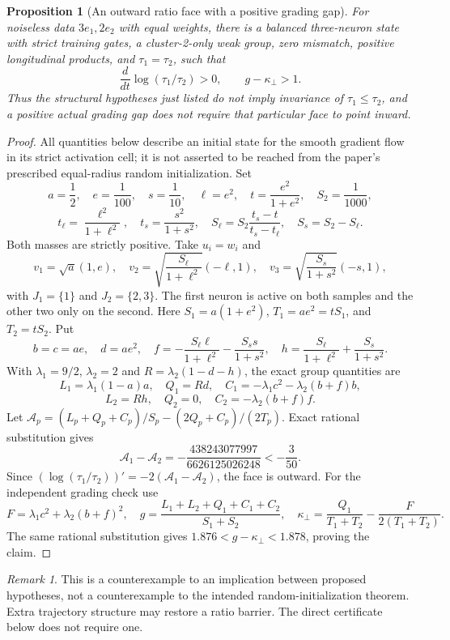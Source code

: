 \documentclass{article} %
\theoremstyle{plain}
\newtheorem{proposition}[theorem]{Proposition}
\theoremstyle{definition}
\theoremstyle{remark}
\newtheorem{remark}[theorem]{Remark}
\begin{document}
\begin{proposition}[An outward ratio face with a positive grading gap]
\label{sbgap:counterexample}
For noiseless data $3e_1,2e_2$ with equal weights, there is a balanced
three-neuron state with strict training gates, a cluster-2-only weak group,
zero mismatch, positive
longitudinal products, and $\tau_1=\tau_2$, such that
\[
 \frac{d}{dt}\log(\tau_1/\tau_2)>0,\qquad
 g-\kappa_\perp>1.
\]
Thus the structural hypotheses just listed do not imply invariance of
$\tau_1\le\tau_2$, and a positive actual grading gap does not require that
particular face to point inward.
\end{proposition}
\begin{proof}
All quantities below describe an initial state for the smooth gradient
flow in its strict activation cell; it is not asserted to be reached
from the paper's prescribed equal-radius random initialization.
Set
\[
 a=\frac12,\quad e=\frac1{100},\quad s=\frac1{10},\quad
 \ell=e^2,\quad t=\frac{e^2}{1+e^2},\quad S_2=\frac1{1000},
\]
\[
 t_\ell=\frac{\ell^2}{1+\ell^2},\quad
 t_s=\frac{s^2}{1+s^2},\quad
 S_\ell=S_2\frac{t_s-t}{t_s-t_\ell},\quad S_s=S_2-S_\ell.
\]
Both masses are strictly positive. Take $u_i=w_i$ and
\[
 v_1=\sqrt a(1,e),\quad
 v_2=\sqrt{\frac{S_\ell}{1+\ell^2}}(-\ell,1),\quad
 v_3=\sqrt{\frac{S_s}{1+s^2}}(-s,1),
\]
with $J_1=\{1\}$ and $J_2=\{2,3\}$. The first neuron is active on both
samples and the other two only on the second. Here
$S_1=a(1+e^2)$, $T_1=ae^2=tS_1$, and $T_2=tS_2$.
Put
\[
 b=c=ae,\quad d=ae^2,\quad
 f=-\frac{S_\ell\ell}{1+\ell^2}-\frac{S_s s}{1+s^2},
 \quad h=\frac{S_\ell}{1+\ell^2}+\frac{S_s}{1+s^2}.
\]
With $\lambda_1=9/2$, $\lambda_2=2$ and
$R=\lambda_2(1-d-h)$, the exact group quantities are
\[
 L_1=\lambda_1(1-a)a,\quad Q_1=Rd,\quad
 C_1=-\lambda_1c^2-\lambda_2(b+f)b,
\]
\[
 L_2=Rh,\quad Q_2=0,\quad C_2=-\lambda_2(b+f)f.
\]
Let $\mathcal A_p=(L_p+Q_p+C_p)/S_p-(2Q_p+C_p)/(2T_p)$.
Exact rational substitution gives
\[
 \mathcal A_1-\mathcal A_2
   =-\frac{438243077997}{6626125026248}<-\frac3{50}.
\]
Since $(\log(\tau_1/\tau_2))'=-2(\mathcal A_1-\mathcal A_2)$,
the face is outward. For the independent grading check use
\[
 F=\lambda_1c^2+\lambda_2(b+f)^2,\quad
 g=\frac{L_1+L_2+Q_1+C_1+C_2}{S_1+S_2},\quad
 \kappa_\perp=\frac{Q_1}{T_1+T_2}-\frac{F}{2(T_1+T_2)}.
\]
The same rational substitution gives
$1.876<g-\kappa_\perp<1.878$, proving the claim.
\end{proof}

\begin{remark}
This is a counterexample to an implication between proposed hypotheses,
not a counterexample to the intended random-initialization theorem.
Extra trajectory structure may restore a ratio barrier. The direct
certificate below does not require one.
\end{remark}
\end{document}
